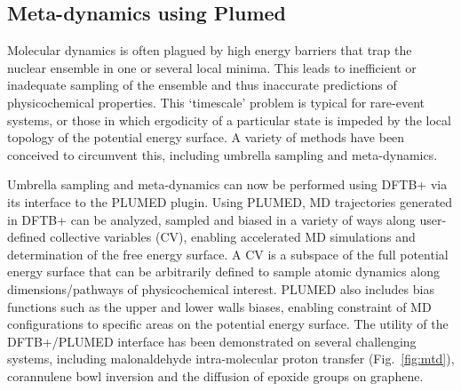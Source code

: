 \documentclass{revtex4-1}
\newcommand{\dftbp}{DFTB+}
\begin{document}
\subsection{Meta-dynamics using Plumed}

Molecular dynamics is often plagued by high energy barriers that trap the
nuclear ensemble in one or several local minima. This leads to inefficient or
inadequate sampling of the ensemble and thus inaccurate predictions of
physicochemical properties.\cite{RN1,RN2,RN3} This `timescale' problem is
typical for rare-event systems, or those in which ergodicity of a particular
state is impeded by the local topology of the potential energy surface. A
variety of methods have been conceived to circumvent this, including
umbrella sampling\cite{RN8} and meta-dynamics.\cite{RN13}

Umbrella sampling and meta-dynamics can now be performed using \dftbp{} via its
interface to the PLUMED plugin.\cite{RN15,RN16} Using PLUMED, MD trajectories
generated in \dftbp{} can be analyzed, sampled and biased in a variety of ways
along user-defined collective variables (CV), enabling accelerated MD
simulations and determination of the free energy surface. A CV is a subspace of
the full potential energy surface that can be arbitrarily defined to sample
atomic dynamics along dimensions/pathways of physicochemical interest.  PLUMED
also includes bias functions such as the upper and lower walls biases, enabling
constraint of MD configurations to specific areas on the potential energy
surface. The utility of the \dftbp{}/PLUMED interface has been demonstrated on
several challenging systems, including malonaldehyde intra-molecular proton
transfer (Fig.~\ref{fig:mtd}), corannulene bowl inversion and the diffusion of
epoxide groups on graphene.\cite{RN16}
\end{document}
